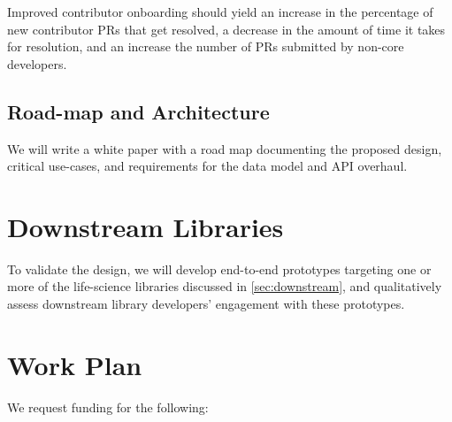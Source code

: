 \documentclass[12pt,letterpaper]{article}  %
\begin{document}
Improved contributor onboarding should yield an increase in the percentage of new contributor PRs that get resolved, a decrease in the amount of time it takes for resolution, and an increase the number of PRs submitted by non-core developers.


\subsection{Road-map and Architecture}

We will write a white paper with a road map documenting the proposed design, critical use-cases, and requirements for the data model and API overhaul.


\section{Downstream Libraries}
To validate the design, we will develop end-to-end prototypes targeting one or more of the life-science libraries discussed in \ref{sec:downstream}, and qualitatively assess downstream library developers' engagement with these prototypes.

\section{Work Plan}

We request funding for the following:
\end{document}
